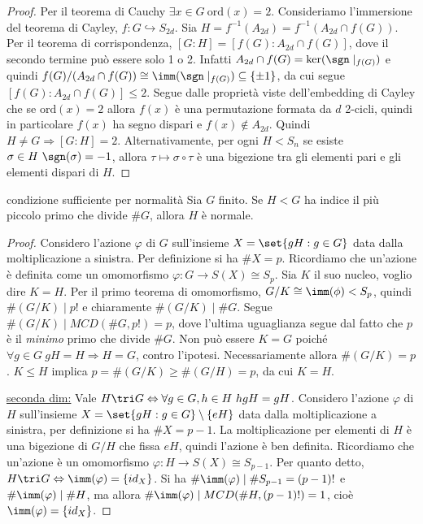 \begin{proof}
    Per il teorema di Cauchy $\exists x \in G \ \text{ord}(x) = 2$. Consideriamo l'immersione del teorema di Cayley, $f: G \hookrightarrow S_{2d}$. Sia $H = f^{-1}(A_{2d}) = f^{-1}(A_{2d} \cap f(G))$. Per il teorema di corrispondenza, $[G : H] = [f(G) : A_{2d} \cap f(G)]$, dove il secondo termine può essere solo 1 o 2. Infatti $A_{2d} \cap f(G) = \ker(\sgn\mid_{f(G)})$ e quindi $f(G)/(A_{2d} \cap f(G)) \cong \imm(\sgn\mid_{f(G)}) \subseteq\{\pm 1\}$, da cui segue $[f(G) : A_{2d} \cap f(G)] \leq 2$.
    Segue dalle proprietà viste dell'embedding di Cayley che se $\text{ord}(x) = 2$ allora $f(x)$ è una permutazione formata da $d$ 2-cicli, quindi in particolare $f(x)$ ha segno dispari e $f(x) \not \in A_{2d}$. Quindi $H \neq G \Rightarrow [G:H] = 2$.
    Alternativamente, per ogni $H < S_n$ se esiste $\sigma \in H \ \sgn(\sigma) = -1$, allora $\tau \mapsto \sigma \circ \tau$ è una bigezione tra gli elementi pari e gli elementi dispari di $H$.
\end{proof}
\begin{proposition}{condizione sufficiente per normalità}
    Sia $G$ finito. Se $H < G$ ha indice il più piccolo primo che divide $\#G$, allora $H$ è normale.
\end{proposition}
\begin{proof}
    Considero l'azione $\varphi$ di $G$ sull'insieme $X = \set{gH : g \in G}$ data dalla moltiplicazione a sinistra. Per definizione si ha $\# X = p $. Ricordiamo che un'azione è definita come un omomorfismo $\varphi: G \rightarrow S(X) \cong S_p$. Sia $K$ il suo nucleo, voglio dire $K = H$. Per il primo teorema di omomorfismo, $G/K \cong \imm(\phi) < S_p$, quindi $\#(G/K) \mid p!$ e chiaramente $\#(G/K) \mid \#G$. Segue $\#(G/K) \mid MCD(\# G, p!) = p$, dove l'ultima uguaglianza segue dal fatto che $p$ è il \textit{minimo} primo che divide $\#G$. Non può essere $K = G$ poiché $\forall g \in G \ gH = H \Rightarrow H = G$, contro l'ipotesi. Necessariamente allora $\#(G/K) = p$. $K \leq H$ implica $p = \#(G/K) \geq \#(G/H) = p$, da cui $K = H$.

    \underline{seconda dim:}
    Vale $H \tri G \Leftrightarrow \forall g \in G, h \in H \ hgH = gH$. Considero l'azione $\varphi$ di $H$ sull'insieme $X = \set{gH : g \in G} \setminus \{ eH \}$ data dalla moltiplicazione a sinistra, per definizione si ha $\# X = p - 1$.
    La moltiplicazione per elementi di $H$ è una bigezione di $G/H$ che fissa $eH$, quindi l'azione è ben definita. Ricordiamo che un'azione è un omomorfismo $\varphi: H \rightarrow S(X) \cong S_{p-1}$. Per quanto detto, $H \tri G \Leftrightarrow \imm(\varphi) = \{ id_X \}$. Si ha $\# \imm(\varphi) \mid \#S_{p-1} = (p-1)!$ e $\# \imm(\varphi) \mid \# H$, ma allora $\#\imm(\varphi) \mid MCD(\#H, (p-1)!) = 1$, cioè $\imm(\varphi) = \{id_X\}$.
\end{proof}
